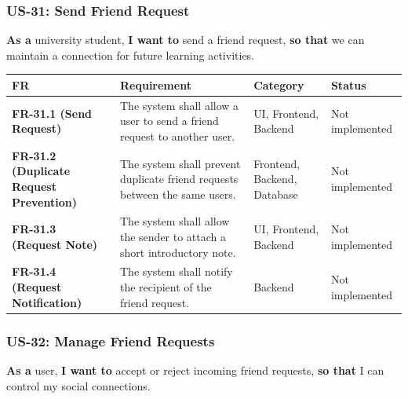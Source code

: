 \documentclass[12pt]{article}
\renewcommand{\baselinestretch}{1.5}
\begin{document}
\hypertarget{sec:us-31-send-friend-request}{}
\subsubsection*{US-31: Send Friend Request}
\par\medskip

\textbf{As a} university student, \textbf{I want to} send a friend request, \textbf{so that} we can maintain a connection for future learning activities.
\par\medskip

\begingroup
\small
\renewcommand{\baselinestretch}{1.0}\selectfont
\renewcommand{\arraystretch}{1.15}
\setlength{\tabcolsep}{6pt}
\begin{longtable}{|>{\raggedright\arraybackslash}p{}|>{\raggedright\arraybackslash}p{}|>{\raggedright\arraybackslash}p{}|>{\raggedright\arraybackslash}p{}|}
\hline
\textbf{FR} & \textbf{Requirement} & \textbf{Category} & \textbf{Status} \\ \hline
\endhead
\textbf{FR-31.1 (Send Request)} & The system shall allow a user to send a friend request to another user. & UI, Frontend, Backend & Not implemented \\ \hline
\textbf{FR-31.2 (Duplicate Request Prevention)} & The system shall prevent duplicate friend requests between the same users. & Frontend, Backend, Database & Not implemented \\ \hline
\textbf{FR-31.3 (Request Note)} & The system shall allow the sender to attach a short introductory note. & UI, Frontend, Backend & Not implemented \\ \hline
\textbf{FR-31.4 (Request Notification)} & The system shall notify the recipient of the friend request. & Backend & Not implemented \\ \hline
\end{longtable}
\endgroup
\par\medskip

\hypertarget{sec:us-32-manage-friend-requests}{}
\subsubsection*{US-32: Manage Friend Requests}
\par\medskip

\textbf{As a} user, \textbf{I want to} accept or reject incoming friend requests, \textbf{so that} I can control my social connections.
\par\medskip
\end{document}
